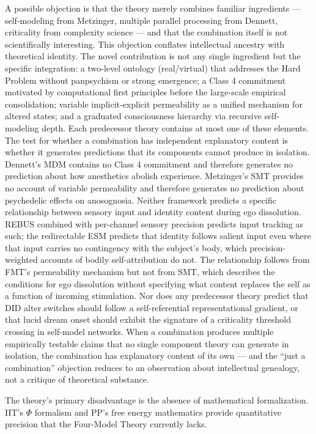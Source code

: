 \documentclass[12pt]{article}
\begin{document}
A possible objection is that the theory merely combines familiar ingredients --- self-modeling from Metzinger, multiple parallel processing from Dennett, criticality from complexity science --- and that the combination itself is not scientifically interesting. This objection conflates intellectual ancestry with theoretical identity. The novel contribution is not any single ingredient but the specific integration: a two-level ontology (real/virtual) that addresses the Hard Problem without panpsychism or strong emergence; a Class 4 commitment motivated by computational first principles before the large-scale empirical consolidation; variable implicit-explicit permeability as a unified mechanism for altered states; and a graduated consciousness hierarchy via recursive self-modeling depth. Each predecessor theory contains at most one of these elements. The test for whether a combination has independent explanatory content is whether it generates predictions that its components cannot produce in isolation. Dennett's MDM contains no Class 4 commitment and therefore generates no prediction about how anesthetics abolish experience. Metzinger's SMT provides no account of variable permeability and therefore generates no prediction about psychedelic effects on anosognosia. Neither framework predicts a specific relationship between sensory input and identity content during ego dissolution. REBUS combined with per-channel sensory precision predicts input tracking as such; the redirectable ESM predicts that identity follows salient input even where that input carries no contingency with the subject's body, which precision-weighted accounts of bodily self-attribution do not. The relationship follows from FMT's permeability mechanism but not from SMT, which describes the conditions for ego dissolution without specifying what content replaces the self as a function of incoming stimulation. Nor does any predecessor theory predict that DID alter switches should follow a self-referential representational gradient, or that lucid dream onset should exhibit the signature of a criticality threshold crossing in self-model networks. When a combination produces multiple empirically testable claims that no single component theory can generate in isolation, the combination has explanatory content of its own --- and the ``just a combination'' objection reduces to an observation about intellectual genealogy, not a critique of theoretical substance.

The theory's primary disadvantage is the absence of mathematical formalization. IIT's $\Phi$ formalism and PP's free energy mathematics provide quantitative precision that the Four-Model Theory currently lacks.
\end{document}
